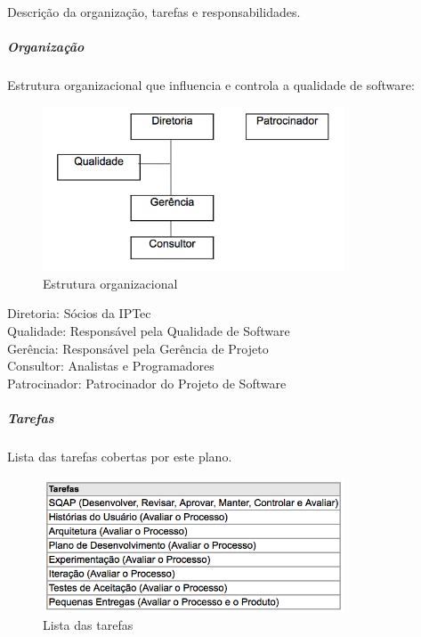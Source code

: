 Descrição da organização, tarefas e responsabilidades.

\subparagraph{Organização}

Estrutura organizacional que influencia e controla a qualidade de software:

\begin{figure}[H]
  \centering
  \includegraphics[width=0.8\textwidth]{softwareengineer/images/hierarchy} 
  \caption{Estrutura organizacional}
  \label{fig:hierarchy} 
\end{figure}

Diretoria: Sócios da IPTec \\

Qualidade: Responsável pela Qualidade de Software \\

Gerência: Responsável pela Gerência de Projeto \\

Consultor: Analistas e Programadores \\

Patrocinador: Patrocinador do Projeto de Software \\

\subparagraph{Tarefas}

Lista das tarefas cobertas por este plano.

\begin{figure}[H]
  \centering
  \includegraphics[width=0.8\textwidth]{softwareengineer/images/task-list} 
  \caption{Lista das tarefas}
  \label{fig:task-list} 
\end{figure}

